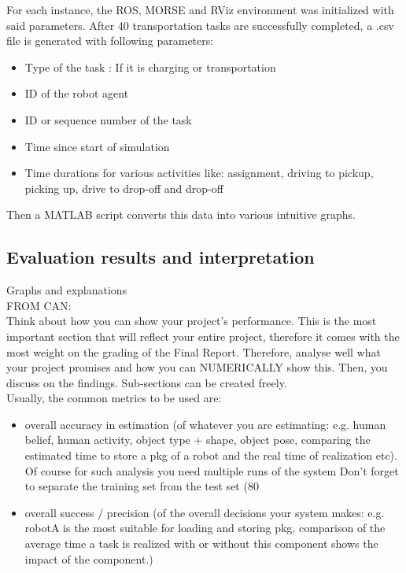 \documentclass[journal]{IEEEtran}
\begin{document}
For each instance, the ROS, MORSE and RViz environment was initialized with said parameters. After 40 transportation tasks are successfully completed, a .csv file is generated with following parameters:
\begin{itemize}
\item Type of the task : If it is charging or transportation
\item ID of the robot agent  
\item ID or sequence number of the task
\item Time since start of simulation
\item Time durations for various activities like: assignment, driving to pickup, picking up, drive to drop-off and drop-off 
\end{itemize}
Then a MATLAB script converts this data into various intuitive graphs. 


\subsection{Evaluation results and interpretation}

Graphs and explanations
\\
FROM CAN:
\\
Think about how you can show your project’s performance. This is the most important section that will reflect your entire project, therefore it comes with the most weight on the grading of the Final Report. Therefore, analyse well what your project promises and how you can NUMERICALLY show this. Then, you discuss on the findings. Sub-sections can be created freely.
\\
Usually, the common metrics to be used are: 
\begin{itemize}
\item
overall accuracy in estimation (of whatever you are estimating: e.g. human belief, human activity, object type + shape, object pose, comparing the estimated time to store a pkg of a robot and the real time of realization etc).
Of course for such analysis you need multiple runs of the system
Don’t forget to separate the training set from the test set (80%

\item
overall success / precision (of the overall decisions your system makes: e.g. robotA is the most suitable for loading and storing pkg, comparison of the average time a task is realized with or without this component shows the impact of the component.)

\end{itemize}
\end{document}
